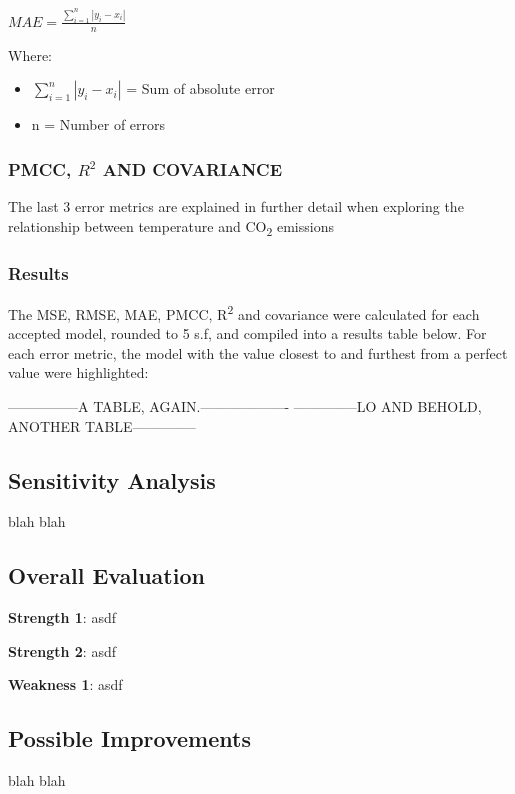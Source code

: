 \documentclass{mcmthesis}
\begin{document}
    ${\displaystyle {MAE} ={\frac {\sum _{i=1}^{n}\left|y_{i}-x_{i}\right|}{n}}}$

    Where:
    \begin{itemize}
        \item ${\sum _{i=1}^{n}\left|y_{i}-x_{i}\right|}$ = Sum of absolute error
        \item {n} = Number of errors
    \end{itemize}

    \subsubsection{PMCC, ${R^2}$ AND COVARIANCE}
    The last 3 error metrics are explained in further detail when exploring the relationship between temperature and CO\textsubscript{2} emissions

    \subsubsection{Results}
    The MSE, RMSE, MAE, PMCC, R\textsuperscript{2} and covariance were calculated for each accepted model, rounded to 5 s.f, and compiled into a results table below. For each error metric, the model with the value closest to and furthest from a perfect value were highlighted:

    ---------------A TABLE, AGAIN.-------------------
    --------------LO AND BEHOLD, ANOTHER TABLE--------------


    \subsection{Sensitivity Analysis}
    blah blah


    \subsection{Overall Evaluation}

    \noindent\textbf{Strength 1}: asdf

    \noindent\textbf{Strength 2}: asdf

    \noindent\textbf{Weakness 1}: asdf


    \subsection{Possible Improvements}
    blah blah

    \newpage
\end{document}
